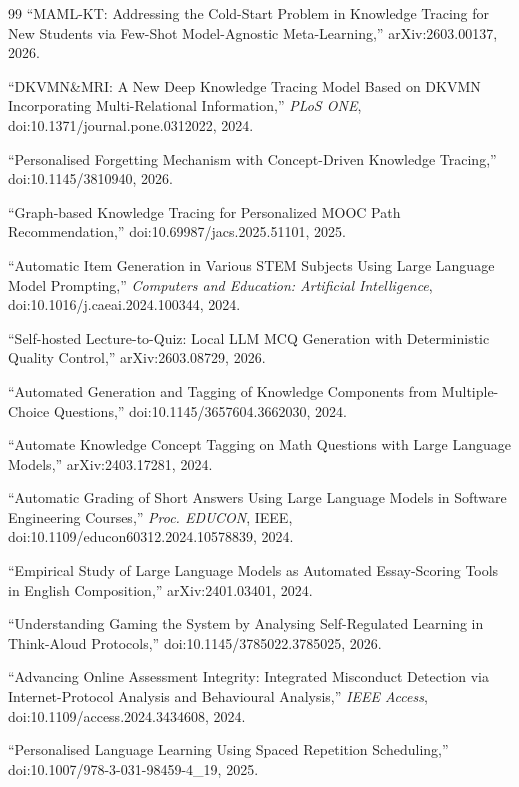 \documentclass[12pt]{report}
\begin{document}
\begin{thebibliography}{99}
 ``MAML-KT: Addressing the Cold-Start Problem in Knowledge Tracing for New Students via Few-Shot Model-Agnostic Meta-Learning,'' arXiv:2603.00137, 2026.

 ``DKVMN\&MRI: A New Deep Knowledge Tracing Model Based on DKVMN Incorporating Multi-Relational Information,'' \textit{PLoS ONE}, doi:10.1371/journal.pone.0312022, 2024.

 ``Personalised Forgetting Mechanism with Concept-Driven Knowledge Tracing,'' doi:10.1145/3810940, 2026.

 ``Graph-based Knowledge Tracing for Personalized MOOC Path Recommendation,'' doi:10.69987/jacs.2025.51101, 2025.

 ``Automatic Item Generation in Various STEM Subjects Using Large Language Model Prompting,'' \textit{Computers and Education: Artificial Intelligence}, doi:10.1016/j.caeai.2024.100344, 2024.

 ``Self-hosted Lecture-to-Quiz: Local LLM MCQ Generation with Deterministic Quality Control,'' arXiv:2603.08729, 2026.

 ``Automated Generation and Tagging of Knowledge Components from Multiple-Choice Questions,'' doi:10.1145/3657604.3662030, 2024.

 ``Automate Knowledge Concept Tagging on Math Questions with Large Language Models,'' arXiv:2403.17281, 2024.

 ``Automatic Grading of Short Answers Using Large Language Models in Software Engineering Courses,'' \textit{Proc. EDUCON}, IEEE, doi:10.1109/educon60312.2024.10578839, 2024.

 ``Empirical Study of Large Language Models as Automated Essay-Scoring Tools in English Composition,'' arXiv:2401.03401, 2024.

 ``Understanding Gaming the System by Analysing Self-Regulated Learning in Think-Aloud Protocols,'' doi:10.1145/3785022.3785025, 2026.

 ``Advancing Online Assessment Integrity: Integrated Misconduct Detection via Internet-Protocol Analysis and Behavioural Analysis,'' \textit{IEEE Access}, doi:10.1109/access.2024.3434608, 2024.

 ``Personalised Language Learning Using Spaced Repetition Scheduling,'' doi:10.1007/978-3-031-98459-4\_19, 2025.


\end{thebibliography}
\end{document}
